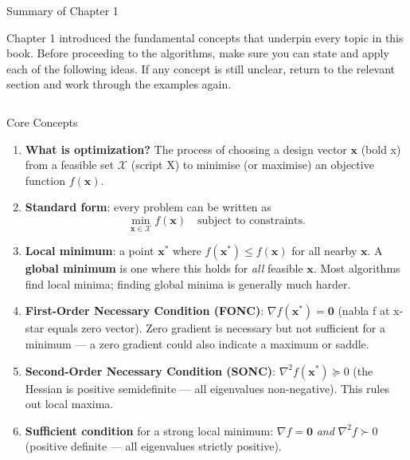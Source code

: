 \documentclass[aspectratio=169,10pt]{beamer}
\newcommand{\vx}{\mathbf{x}}
\newcommand{\grad}{\nabla}
\newcommand{\hess}{\nabla^2}
\begin{document}
\begin{frame}[allowframebreaks]{Summary of Chapter 1}

Chapter 1 introduced the fundamental concepts that underpin every topic in
this book.  Before proceeding to the algorithms, make sure you can state and
apply each of the following ideas.  If any concept is still unclear, return
to the relevant section and work through the examples again.

  \begin{columns}[T]
      \begin{block}{Core Concepts}
        \begin{enumerate}
          \item \textbf{What is optimization?}  The process of choosing a
            design vector $\vx$ (bold x) from a feasible set $\mathcal{X}$
            (script X) to minimise (or maximise) an objective function $f(\vx)$.

          \item \textbf{Standard form}: every problem can be written as
            \[
              \min_{\vx \in \mathcal{X}} f(\vx)
              \quad \text{subject to constraints.}
            \]

          \item \textbf{Local minimum}: a point $\vx^*$ where $f(\vx^*) \leq f(\vx)$
            for all nearby $\vx$.  A \textbf{global minimum} is one where this
            holds for \emph{all} feasible $\vx$.  Most algorithms find local
            minima; finding global minima is generally much harder.

          \item \textbf{First-Order Necessary Condition (FONC)}:
            $\grad f(\vx^*) = \mathbf{0}$ (nabla f at x-star equals zero
            vector).  Zero gradient is necessary but not sufficient for a
            minimum --- a zero gradient could also indicate a maximum or saddle.

          \item \textbf{Second-Order Necessary Condition (SONC)}:
            $\hess f(\vx^*) \succeq 0$ (the Hessian is positive semidefinite ---
            all eigenvalues non-negative).  This rules out local maxima.

          \item \textbf{Sufficient condition} for a strong local minimum:
            $\grad f = \mathbf{0}$ \emph{and} $\hess f \succ 0$ (positive
            definite --- all eigenvalues strictly positive).


\end{enumerate}
\end{block}
\end{columns}
\end{frame}
\end{document}
